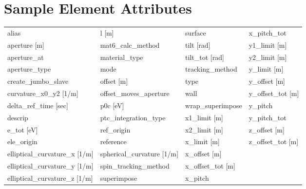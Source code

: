  \section{Sample Element Attributes}
 \label{s:list.sample}
 
 \begin{tabular}{llll} \toprule
alias                            & l [m]                            & surface                          & x_pitch_tot                      \\
aperture [m]                     & mat6_calc_method                 & tilt [rad]                       & y1_limit [m]                     \\
aperture_at                      & material_type                    & tilt_tot [rad]                   & y2_limit [m]                     \\
aperture_type                    & mode                             & tracking_method                  & y_limit [m]                      \\
create_jumbo_slave               & offset [m]                       & type                             & y_offset [m]                     \\
curvature_x0_y2 [1/m]            & offset_moves_aperture            & wall                             & y_offset_tot [m]                 \\
delta_ref_time [sec]             & p0c [eV]                         & wrap_superimpose                 & y_pitch                          \\
descrip                          & ptc_integration_type             & x1_limit [m]                     & y_pitch_tot                      \\
e_tot [eV]                       & ref_origin                       & x2_limit [m]                     & z_offset [m]                     \\
ele_origin                       & reference                        & x_limit [m]                      & z_offset_tot [m]                 \\
elliptical_curvature_x [1/m]     & spherical_curvature [1/m]        & x_offset [m]                     &                                  \\
elliptical_curvature_y [1/m]     & spin_tracking_method             & x_offset_tot [m]                 &                                  \\
elliptical_curvature_z [1/m]     & superimpose                      & x_pitch                          &                                  \\
 \bottomrule
 \end{tabular}
 \vfill
 
